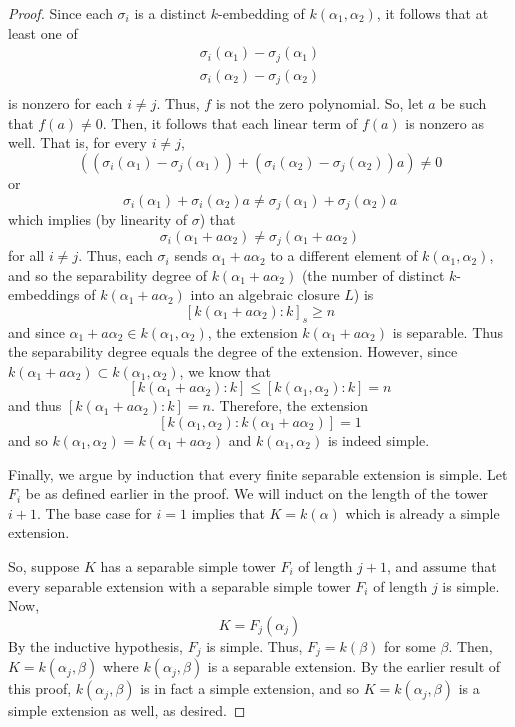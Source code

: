 \documentclass[12pt,reqno]{amsart}
\begin{document}
\begin{proof}
    Since each $\sigma_i$ is a distinct $k$-embedding of $k(\alpha_1,\alpha_2)$,
    it follows that at least one of
    \[
        \begin{aligned}
            \sigma_i(\alpha_1)-\sigma_j(\alpha_1)\\
            \sigma_i(\alpha_2)-\sigma_j(\alpha_2)\\
        \end{aligned}
    \]
    is nonzero for each $i\neq j$. Thus, $f$ is not the zero polynomial. So, let
    $a$ be such that $f(a)\neq 0$. Then, it follows that each linear term of
    $f(a)$ is nonzero as well. That is, for every $i\neq j$,
    \[
        ((\sigma_i(\alpha_1) - \sigma_j(\alpha_1)) +
        (\sigma_i(\alpha_2) -\sigma_j(\alpha_2))a)\neq 0
    \]
    or
    \[
        \sigma_i(\alpha_1) + \sigma_i(\alpha_2)a \neq
        \sigma_j(\alpha_1)+\sigma_j(\alpha_2)a
    \]
    which implies (by linearity of $\sigma$) that
    \[
        \sigma_i(\alpha_1 + a\alpha_2) \neq \sigma_j(\alpha_1 + a\alpha_2)
    \]
    for all $i\neq j$. Thus, each $\sigma_i$ sends $\alpha_1 + a\alpha_2$ to a
    different element of $k(\alpha_1,\alpha_2)$, and so the separability degree
    of $k(\alpha_1 + a\alpha_2)$
    (the number of distinct $k$-embeddings of $k(\alpha_1 + a\alpha_2)$ into an
    algebraic closure $L$) is
    \[
        [k(\alpha_1 + a\alpha_2):k]_s\geq n
    \]
    and since $\alpha_1 +a\alpha_2\in k(\alpha_1,\alpha_2)$, the extension
    $k(\alpha_1+a\alpha_2)$ is separable. Thus the separability degree equals
    the degree of the extension. However, since $k(\alpha_1 +a\alpha_2)\subset
    k(\alpha_1,\alpha_2)$, we know that
    \[
        [k(\alpha_1+a\alpha_2):k]\leq [k(\alpha_1,\alpha_2):k]=n
    \]
    and thus $[k(\alpha_1+a\alpha_2):k]=n$. Therefore, the extension
    \[
        [k(\alpha_1,\alpha_2):k(\alpha_1+a\alpha_2)]=1
    \]
    and so $k(\alpha_1,\alpha_2) = k(\alpha_1+a\alpha_2)$ and
    $k(\alpha_1,\alpha_2)$ is indeed simple.

    Finally, we argue by induction that every finite separable extension is
    simple. Let $F_i$ be as defined earlier in the proof. We will induct on the
    length of the tower $i+1$. The base case for $i=1$ implies that $K =
    k(\alpha)$ which is already a simple extension.

    So, suppose $K$ has a separable simple tower $F_i$ of length $j+1$, and
    assume that every separable extension with a separable simple tower $F_i$ of
    length $j$ is simple. Now,
    \[
        K = F_j(\alpha_j)
    \]
    By the inductive hypothesis, $F_j$ is simple. Thus, $F_j = k(\beta)$ for
    some $\beta$. Then, $K = k(\alpha_j,\beta)$ where $k(\alpha_j,\beta)$ is a
    separable extension. By the earlier result of this proof,
    $k(\alpha_j,\beta)$ is in fact a simple extension, and so
    $K=k(\alpha_j,\beta)$ is a simple extension as well, as desired.
\end{proof}
\end{document}
